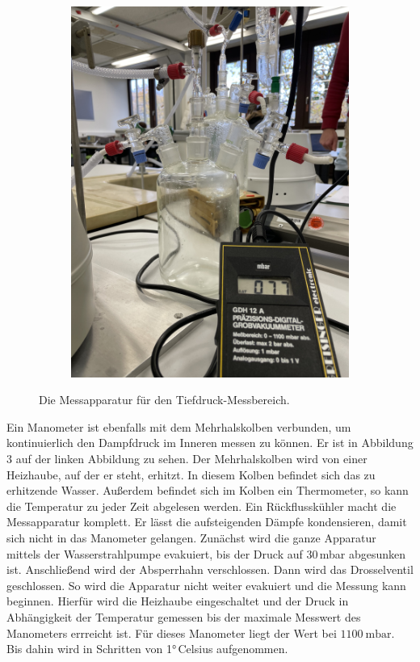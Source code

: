 \begin{figure}[H]
\begin{subfigure}{0.45\textwidth}
    \includegraphics[angle=270,scale=0.05]{content/Woulffsche_Flasche.jpeg}
    \label{Abb:Woulffsche_Flasche}
    \end{subfigure}
    \caption{Die Messapparatur für den Tiefdruck-Messbereich.}
\end{figure}\noindent
Ein Manometer ist ebenfalls mit dem Mehrhalskolben verbunden, um kontinuierlich den Dampfdruck im Inneren messen zu können.
Er ist in Abbildung 3 auf der linken Abbildung zu sehen.
Der Mehrhalskolben wird von einer Heizhaube, auf der er steht, erhitzt.
In diesem Kolben befindet sich das zu erhitzende Wasser.
Außerdem befindet sich im Kolben ein Thermometer, so kann die Temperatur zu jeder Zeit abgelesen werden.
Ein Rückflusskühler macht die Messapparatur komplett.
Er lässt die aufsteigenden Dämpfe kondensieren, damit sich nicht in das Manometer gelangen.
\noindent
Zunächst wird die ganze Apparatur mittels der Wasserstrahlpumpe evakuiert, bis der Druck auf 30\,mbar abgesunken ist.
Anschließend wird der Absperrhahn verschlossen.
Dann wird das Drosselventil geschlossen.
So wird die Apparatur nicht weiter evakuiert und die Messung kann beginnen.
\noindent
Hierfür wird die Heizhaube eingeschaltet und der Druck in Abhängigkeit der Temperatur gemessen bis der maximale Messwert des Manometers errreicht ist.
Für dieses Manometer liegt der Wert bei $\SI{1100}{\milli\bar}$.
Bis dahin wird in Schritten von 1°\,Celsius aufgenommen.
